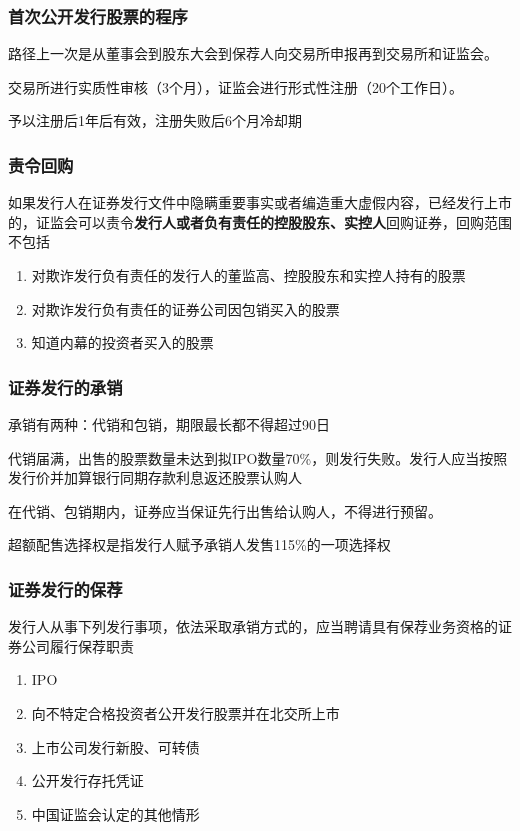 \documentclass[UTF8,12pt]{ctexart}
\numberwithin{equation}{section} %
\numberwithin{figure}{section}
\numberwithin{table}{section}
\begin{document}
	
	\subsubsection{首次公开发行股票的程序}
	路径上一次是从董事会到股东大会到保荐人向交易所申报再到交易所和证监会。
	
	交易所进行实质性审核（3个月），证监会进行形式性注册（20个工作日）。
	
	予以注册后1年后有效，注册失败后6个月冷却期
	
	\subsubsection{责令回购}
	如果发行人在证券发行文件中隐瞒重要事实或者编造重大虚假内容，已经发行上市的，证监会可以责令\textbf{发行人或者负有责任的控股股东、实控人}回购证券，回购范围不包括
	\begin{enumerate}
		\item 对欺诈发行负有责任的发行人的董监高、控股股东和实控人持有的股票
		
		\item 对欺诈发行负有责任的证券公司因包销买入的股票
		
		\item 知道内幕的投资者买入的股票
	\end{enumerate}
	
	
	\subsubsection{证券发行的承销}
	承销有两种：代销和包销，期限最长都不得超过90日
	
	代销届满，出售的股票数量未达到拟IPO数量70\%，则发行失败。发行人应当按照发行价并加算银行同期存款利息返还股票认购人
	
	在代销、包销期内，证券应当保证先行出售给认购人，不得进行预留。
	
	超额配售选择权是指发行人赋予承销人发售115\%的一项选择权	
	
	
	\subsubsection{证券发行的保荐}
	发行人从事下列发行事项，依法采取承销方式的，应当聘请具有保荐业务资格的证券公司履行保荐职责
	\begin{enumerate}
		\item IPO
		
		\item 向不特定合格投资者公开发行股票并在北交所上市
		
		\item 上市公司发行新股、可转债
		
		\item 公开发行存托凭证
		
		\item 中国证监会认定的其他情形
	\end{enumerate}
	
\end{document}
